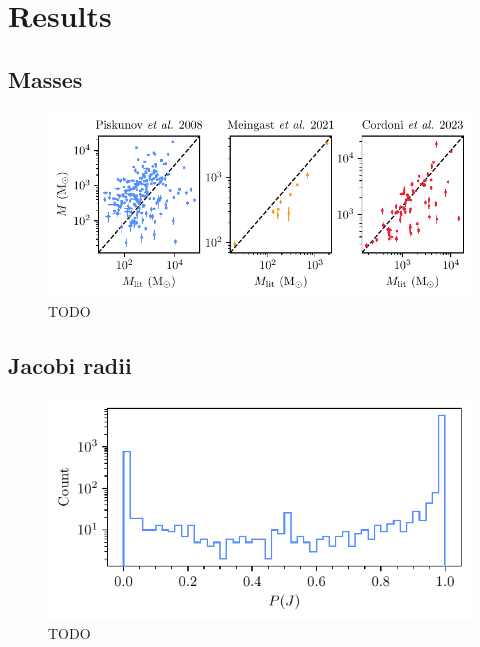 \section{Results}
\label{sec:dynamics:results}


\subsection{Masses}
\label{sec:dynamics:results:masses}

\begin{figure}[t]
    \centering
    \includegraphics[width=\textwidth]{fig/c4/results_mass_comparison.pdf}
    \caption[TODO]{TODO}
    \label{fig:dynamics:results:mass_comparison}
 \end{figure}


\subsection{Jacobi radii}
\label{sec:dynamics:results:radii}

\begin{figure}[t]
    \centering
    \includegraphics[width=\textwidth]{fig/c4/results_p_jac_distribution.pdf}
    \caption[TODO]{TODO}
    \label{fig:dynamics:results:jacobi_radii_distribution}
 \end{figure}


